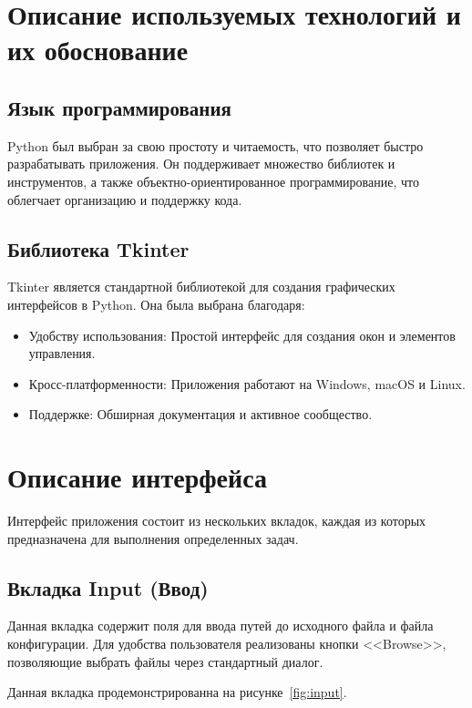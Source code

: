 \section{Описание используемых технологий и их обоснование}

\subsection{Язык программирования}

Python был выбран за свою простоту и читаемость,
что позволяет быстро разрабатывать приложения.
Он поддерживает множество библиотек и инструментов,
а также объектно-ориентированное программирование,
что облегчает организацию и поддержку кода.

\subsection{Библиотека Tkinter}

Tkinter является стандартной библиотекой
для создания графических интерфейсов в Python.
Она была выбрана благодаря:

\begin{itemize}
	\item Удобству использования:
		Простой интерфейс для создания окон и элементов управления.
	\item Кросс-платформенности:
		Приложения работают на Windows, macOS и Linux.
	\item Поддержке: Обширная документация и активное сообщество.
\end{itemize}

\clearpage

\section{Описание интерфейса}

Интерфейс приложения состоит из нескольких вкладок,
каждая из которых предназначена для выполнения определенных задач.

\subsection{Вкладка Input (Ввод)}

Данная вкладка содержит поля для ввода путей до исходного файла
и файла конфигурации.
Для удобства пользователя реализованы кнопки <<Browse>>,
позволяющие выбрать файлы через стандартный диалог.

Данная вкладка продемонстрированна на рисунке~\ref{fig:input}.

